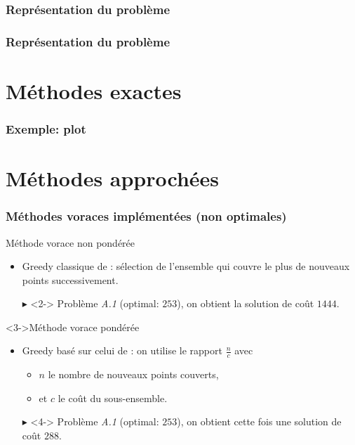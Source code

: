 \documentclass[aspectratio=169,11pt]{beamer}
\begin{document}

	\begin{frame}
		\frametitle{Représentation du problème}
		\centering%
		\resizebox{0.8\textwidth}{!}{}%
	\end{frame}

	\begin{frame}
		\frametitle{Représentation du problème}
		\centering%
		\resizebox{\textwidth}{!}{}%
	\end{frame}

	\section{Méthodes exactes}

	\begin{frame}
		\frametitle{Exemple: plot}
		\centering
	\end{frame}

	\section{Méthodes approchées}

	\begin{frame}
		\frametitle{Méthodes voraces implémentées (non optimales)}
		\begin{block}{Méthode vorace non pondérée}
			\begin{itemize}
				\item Greedy classique de \citeauthor{Johnson:1973:AAC:800125.804034}: sélection de l'ensemble qui couvre le plus de nouveaux points successivement.
				\item[\alert{\(\blacktriangleright\)}]<2-> Problème \emph{A.1} (optimal: \(253\)), on obtient la solution de coût \alert{\(1444\)}.
			\end{itemize}
		\end{block}
		\begin{block}<3->{Méthode vorace pondérée}
			\begin{itemize}
				\item Greedy basé sur celui de \citeauthor{Johnson:1973:AAC:800125.804034}: on utilise le rapport \(\frac{n}{c}\) avec
					\begin{itemize}
						\item \(n\) le nombre de nouveaux points couverts,
						\item et \(c\) le coût du sous-ensemble.
					\end{itemize}
				\item[\alert{\(\blacktriangleright\)}]<4-> Problème \emph{A.1} (optimal: \(253\)), on obtient cette fois une solution de coût \alert{\(288\)}.
			\end{itemize}
		\end{block}
	\end{frame}
\end{document}
